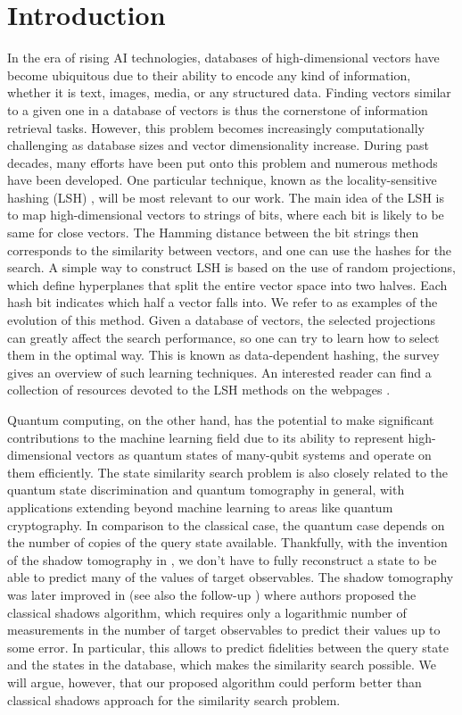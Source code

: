 \documentclass[pra,twocolumn,superscriptaddress,longbibliography]{revtex4-2}
\theoremstyle{remark}
\numberwithin{equation}{section}
\begin{document}
\section{Introduction}
In the era of rising AI technologies, databases of high-dimensional vectors have become ubiquitous 
due to their ability to encode any kind of information, 
whether it is text, images, media, or any structured data. 
Finding vectors similar to a given one in a database of vectors is thus the cornerstone of information retrieval tasks. 
However, this problem becomes increasingly computationally challenging as database sizes and vector dimensionality increase.
During past decades, many efforts have been put onto this problem and numerous methods have been developed. 
One particular technique, known as the locality-sensitive hashing (LSH) \cite{LSH2002}, will be most relevant to our work. 
The main idea of the LSH is to map high-dimensional vectors to strings of bits, 
where each bit is likely to be same for close vectors. 
The Hamming distance between the bit strings then corresponds to the similarity between vectors, 
and one can use the hashes for the search. 
A simple way to construct LSH is based on the use of random projections, 
which define hyperplanes that split the entire vector space into two halves. 
Each hash bit indicates which half a vector falls into. 
We refer to \cite{OptimalLSH2006, AngularLSH2015} as examples of the evolution of this method. 
Given a database of vectors, the selected projections can greatly affect the search performance, 
so one can try to learn how to select them in the optimal way.
This is known as data-dependent hashing, 
the survey \cite{survey2016} gives an overview of such learning techniques.
An interested reader can find a collection of resources devoted to the LSH methods on the webpages \cite{page_Andoni, page_LWJ}. 

Quantum computing, on the other hand, has the potential to make significant contributions to the machine learning field 
due to its ability to represent high-dimensional vectors as quantum states of many-qubit systems and operate on them efficiently. 
The state similarity search problem is also closely related to the quantum state discrimination \cite{QSD2009, QSD2015} 
and quantum tomography in general, 
with applications extending beyond machine learning to areas like quantum cryptography. 
In comparison to the classical case, the quantum case depends on the number of copies of the query state available. 
Thankfully, with the invention of the shadow tomography in \cite{shadow2017}, 
we don't have to fully reconstruct a state to be able to predict many of the values of target observables. 
The shadow tomography was later improved in \cite{shadow2020} (see also the follow-up \cite{shadow2022}) 
where authors proposed the classical shadows algorithm, 
which requires only a logarithmic number of measurements in the number of target observables 
to predict their values up to some error. 
In particular, this allows to predict fidelities between the query state and the states in the database, 
which makes the similarity search possible. 
We will argue, however, that our proposed algorithm could perform better than classical shadows approach for the similarity search problem. 
\end{document}
